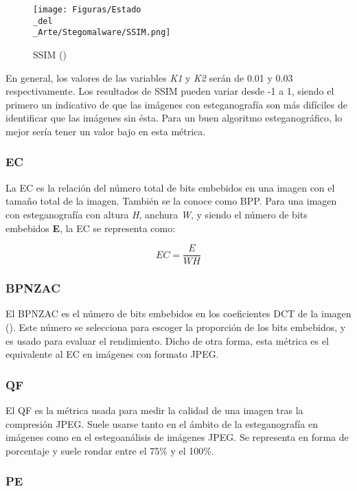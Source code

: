\begin{figure}[H]
  \centering
  \texttt{[image: Figuras/Estado\\\_del\\\_Arte/Stegomalware/SSIM.png]}
  \label{fig:SSIM}
  \caption{SSIM (\cite{stegomalware})}
\end{figure}

En general, los valores de las variables \textit{K1} y \textit{K2} serán de 0.01 y 0.03 respectivamente. Los resultados de \ac{SSIM} pueden variar desde -1 a 1, siendo el primero un indicativo de que las imágenes con esteganografía son más difíciles de identificar que las imágenes sin ésta. Para un buen algoritmo esteganográfico, lo mejor sería tener un valor bajo en esta métrica.

\subsubsection{EC}

La \ac{EC} es la relación del número total de bits embebidos en una imagen con el tamaño total de la imagen. También se la conoce como \ac{BPP}. Para una imagen con esteganografía con altura \textit{H}, anchura \textit{W}, y siendo el número de bits embebidos \textbf{E}, la \ac{EC} se representa como:

\begin{equation}
EC = \frac{E}{WH}
\end{equation}

\subsubsection{BPNZAC}

El \ac{BPNZAC} es el número de bits embebidos en los coeficientes \ac{DCT} de la imagen (\cite{dct}). Este número se selecciona para escoger la proporción de los bits embebidos, y es usado para evaluar el rendimiento. Dicho de otra forma, esta métrica es el equivalente al \ac{EC} en imágenes con formato JPEG. %

\subsubsection{QF}

El \ac{QF} es la métrica usada para medir la calidad de una imagen tras la compresión JPEG. Suele usarse tanto en el ámbito de la esteganografía en imágenes como en el estegoanálisis de imágenes JPEG. Se representa en forma de porcentaje y suele rondar entre el 75\% y el 100\%.

\subsubsection{PE}

